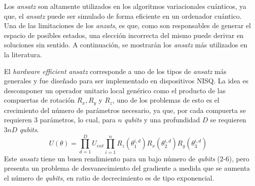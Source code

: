 Los \textit{ansatz} son altamente utilizados en los algoritmos variacionales cuánticos, ya que, el \textit{ansatz} puede ser simulado de forma eficiente en un ordenador cuántico. Una de las limitaciones de los \textit{anzats}, es que, como son responsables de generar el espacio de posibles estados, una elección incorrecta del mismo puede derivar en soluciones sin sentido. A continuación, se mostrarán los \textit{ansatz} más utilizados en la literatura.

El \textit{hardware efficient ansatz}\cite{EfficientAnsatz} corresponde a uno de los tipos de \textit{ansatz} más generales y fue diseñado para ser implementado en dispositivos NISQ. La idea es descomponer un operador unitario local genérico como el producto de las compuertas de rotación $R_x, R_y$ y $R_z$, uno de los problemas de esto es el crecimiento del número de parámetros necesario, ya que, por cada compuerta se requieren $3$ parámetros, lo cual, para $n$ \textit{qubits} y una profundidad $D$ se requieren $3nD$ \textit{qubits}.
\begin{equation*}
    U(\theta) = \prod_{d=1}^{D} U_{ent} \prod_{i=1}^{n} R_z(\theta_1^{i,d})R_x(\theta_2^{i,d})R_y(\theta_3^{i,d})
\end{equation*}
Este \textit{ansatz} tiene un buen rendimiento para un bajo número de \textit{qubits} (2-6), pero presenta un problema de desvanecimiento del gradiente a medida que se aumenta el número de \textit{qubits}, en ratio de decrecimiento es de tipo exponencial\cite{DesvanecimientoGradiente}. 

